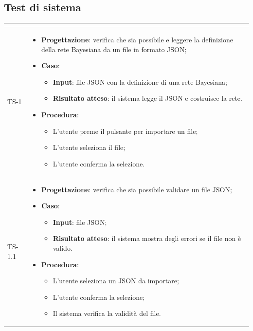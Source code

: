 \subsection{Test di sistema}
\normalsize
\renewcommand{\arraystretch}{1}
\begin{longtable}{|C{2.5cm}|C{13cm}|}
	\hline
	\textbf{\color{title_text}{Test}} & \textbf{\color{title_text}{Specifica}}  \\
	\hline
	\endhead
	{TS-1} &
\begin{itemize}
	\item \textbf{Progettazione}: verifica che sia possibile e leggere la
	definizione della rete Bayesiana da un file in formato JSON;
	\item \textbf{Caso}: 
	\begin{itemize}
		\item \textbf{Input}: file JSON con la definizione di una rete Bayesiana;
		\item \textbf{Risultato atteso}: il sistema legge il JSON e costruisce la rete.
	\end{itemize}
	\item \textbf{Procedura}:
	\begin{itemize}
		\item L'utente preme il pulsante per importare un file;
		\item L'utente seleziona il file;
		\item L'utente conferma la selezione.
	\end{itemize} 
\end{itemize} \\
	\hline
	{TS-1.1} &
\begin{itemize}
	\item \textbf{Progettazione}: verifica che sia possibile validare un
	file JSON;
	\item \textbf{Caso}: 
	\begin{itemize}
		\item \textbf{Input}: file JSON;
		\item \textbf{Risultato atteso}: il sistema mostra degli errori se il file non è valido.
	\end{itemize}
	\item \textbf{Procedura}:
	\begin{itemize}
		\item L'utente seleziona un JSON da importare;
		\item L'utente conferma la selezione;
		\item Il sistema verifica la validità del file.

\end{itemize}
\end{itemize}
\end{longtable}
